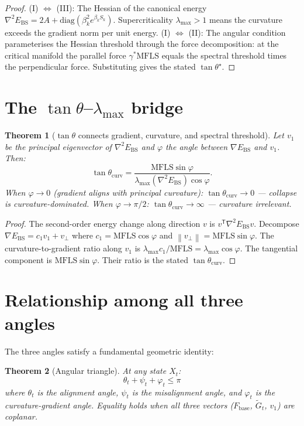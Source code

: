 \documentclass[11pt,a4paper,openany]{book}
\newtheorem{theorem}{Theorem}[chapter]
\theoremstyle{definition}
\newcommand{\T}{^{\mathsf{T}}}
\newcommand{\norm}[1]{\left\|#1\right\|}
\newcommand{\Fbase}{F_{\mathrm{base}}}
\newcommand{\diag}{\mathrm{diag}}
\newcommand{\mfls}{\mathrm{MFLS}}
\begin{document}
\begin{proof}
(I) $\iff$ (III): The Hessian of the canonical energy $\nabla^2 E_\mathrm{BS} = 2A + \diag(\beta_k^2 e^{\beta_k S_k})$.
Supercriticality $\lambda_\mathrm{max} > 1$ means the curvature exceeds the gradient norm per unit energy.
(I) $\iff$ (II): The angular condition parameterises the Hessian threshold through the
force decomposition: at the critical manifold the parallel force $\gamma^*\mfls$ equals
the spectral threshold times the perpendicular force. Substituting gives the stated $\tan\theta^\star$.
\end{proof}

\section{The $\tan\theta$--$\lambda_\mathrm{max}$ bridge}

\begin{theorem}[$\tan\theta$ connects gradient, curvature, and spectral threshold]
Let $v_1$ be the principal eigenvector of $\nabla^2 E_\mathrm{BS}$ and $\varphi$ the angle
between $\nabla E_\mathrm{BS}$ and $v_1$. Then:
\[
\tan\theta_\mathrm{curv} = \frac{\mfls\sin\varphi}{\lambda_\mathrm{max}(\nabla^2 E_\mathrm{BS})\cos\varphi}.
\]
When $\varphi \to 0$ (gradient aligns with principal curvature): $\tan\theta_\mathrm{curv} \to 0$
--- collapse is curvature-dominated.
When $\varphi \to \pi/2$: $\tan\theta_\mathrm{curv} \to \infty$ --- curvature irrelevant.
\end{theorem}

\begin{proof}
The second-order energy change along direction $v$ is $v\T\nabla^2 E_\mathrm{BS} v$.
Decompose $\nabla E_\mathrm{BS} = c_1 v_1 + v_\perp$ where $c_1 = \mfls\cos\varphi$ and $\norm{v_\perp} = \mfls\sin\varphi$.
The curvature-to-gradient ratio along $v_1$ is $\lambda_\mathrm{max}c_1/\mfls = \lambda_\mathrm{max}\cos\varphi$.
The tangential component is $\mfls\sin\varphi$. Their ratio is the stated $\tan\theta_\mathrm{curv}$.
\end{proof}

\section{Relationship among all three angles}

The three angles satisfy a fundamental geometric identity:

\begin{theorem}[Angular triangle]
At any state $X_t$:
\[
\theta_t + \psi_t + \varphi_t \leq \pi
\]
where $\theta_t$ is the alignment angle, $\psi_t$ is the misalignment angle,
and $\varphi_t$ is the curvature-gradient angle. Equality holds when
all three vectors ($\Fbase$, $\tilde G_t$, $v_1$) are coplanar.
\end{theorem}
\end{document}
